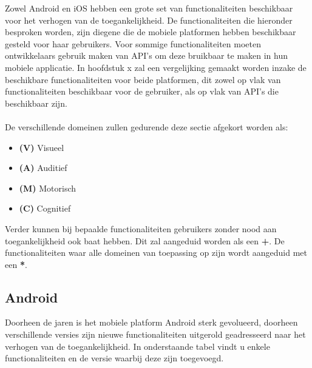 Zowel Android en iOS hebben een grote set van functionaliteiten beschikbaar voor het verhogen van de toegankelijkheid. De functionaliteiten die hieronder besproken worden, zijn diegene die de mobiele platformen hebben beschikbaar gesteld voor haar gebruikers. Voor sommige functionaliteiten moeten ontwikkelaars gebruik maken van \gls{API}'s om deze bruikbaar te maken in hun mobiele applicatie. In hoofdstuk x zal een vergelijking gemaakt worden inzake de beschikbare functionaliteiten voor beide platformen, dit zowel op vlak van functionaliteiten beschikbaar voor de gebruiker, als op vlak van \gls{API}'s die beschikbaar zijn.
\\
\\
De verschillende domeinen zullen gedurende deze sectie afgekort worden als:
\begin{itemize}
    \item \textbf{(V)} Visueel 
    \item \textbf{(A)} Auditief 
    \item \textbf{(M)} Motorisch 
    \item \textbf{(C)} Cognitief
\end{itemize} 

Verder kunnen bij bepaalde functionaliteiten gebruikers zonder nood aan toegankelijkheid ook baat hebben. Dit zal aangeduid worden als een \textbf{+}. De functionaliteiten waar alle domeinen van toepassing op zijn wordt aangeduid met een \textbf{*}.
\newpage
\subsection{Android}

Doorheen de jaren is het mobiele platform Android sterk gevolueerd, doorheen verschillende versies zijn nieuwe functionaliteiten uitgerold geadresseerd naar het verhogen van de toegankelijkheid. In onderstaande tabel vindt u enkele functionaliteiten en de versie waarbij deze zijn toegevoegd.
\label{sec:Android}

